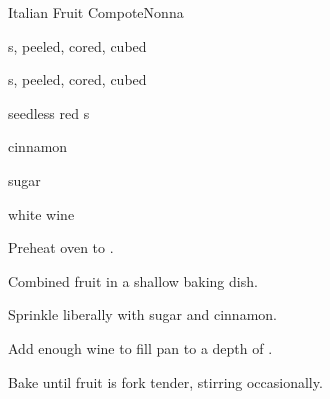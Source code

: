 \begin{recipe}{Italian Fruit Compote}{Nonna}{}

\begin{ingredients}
\item {}s, peeled, cored, cubed
\item {}s, peeled, cored, cubed
\item seedless red s
\item cinnamon
\item sugar
\item white wine
\end{ingredients}

\begin{directions}
\item Preheat oven to .
\item Combined fruit in a shallow baking dish.
\item Sprinkle liberally with sugar and cinnamon.
\item Add enough wine to fill pan to a depth of \inch{\threequarter}.
\item Bake until fruit is fork tender, stirring occasionally.
\end{directions}

\end{recipe}
